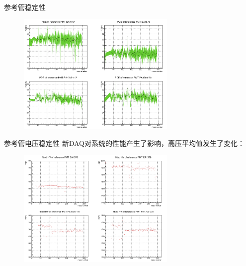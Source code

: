 \documentclass[11pt,compress,xcolor=x11names,UTF8]{beamer}
\begin{document}
\begin{frame}{参考管稳定性}
\begin{figure}
\centering
\includegraphics[width=0.68\textwidth]{ref_sta}
\end{figure}
\end{frame}
\begin{frame}{参考管电压稳定性}
新DAQ对系统的性能产生了影响，高压平均值发生了变化：
\begin{figure}
\centering
\includegraphics[width=0.68\textwidth]{ref_HV_sta}
\end{figure}
\end{frame}
\end{document}
